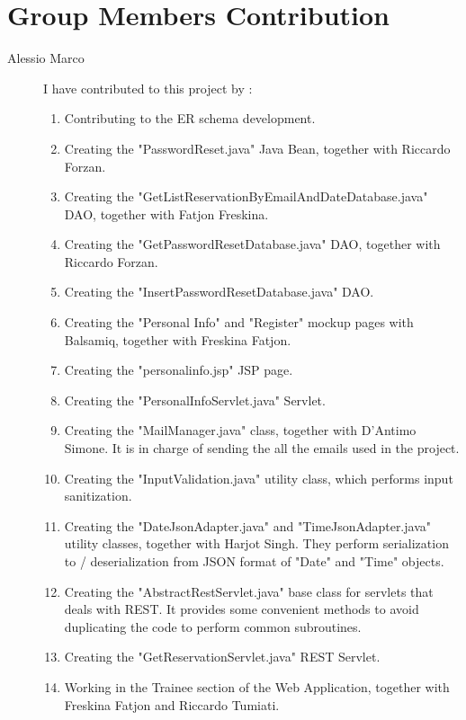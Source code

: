 \section{Group Members Contribution}


\begin{description}

	\item[Alessio Marco] I have contributed to this project by :
	\begin{enumerate}
		\item Contributing to the ER schema development.
		\item Creating the "PasswordReset.java" Java Bean, together with Riccardo Forzan.
		\item Creating the "GetListReservationByEmailAndDateDatabase.java" DAO, together with Fatjon Freskina.
		\item Creating the "GetPasswordResetDatabase.java" DAO, together with Riccardo Forzan.
		\item Creating the "InsertPasswordResetDatabase.java" DAO.
		\item Creating the "Personal Info" and "Register" mockup pages with Balsamiq, together with Freskina Fatjon.
		\item Creating the "personalinfo.jsp" JSP page.
		\item Creating the "PersonalInfoServlet.java" Servlet.
		\item Creating the "MailManager.java" class, together with D'Antimo Simone.
		    It is in charge of sending the all the emails used in the project.
		\item Creating the "InputValidation.java" utility class, which performs input sanitization.
		\item Creating the "DateJsonAdapter.java" and "TimeJsonAdapter.java" utility classes, together with Harjot Singh.
		    They perform serialization to / deserialization from JSON format of "Date" and "Time" objects.
		\item Creating the "AbstractRestServlet.java" base class for servlets that deals with REST.
		    It provides some convenient methods to avoid duplicating the code to perform common subroutines.
		\item Creating the "GetReservationServlet.java" REST Servlet.
		\item Working in the Trainee section of the Web Application, together with Freskina Fatjon and Riccardo Tumiati.
	\end{enumerate}


\end{description}
